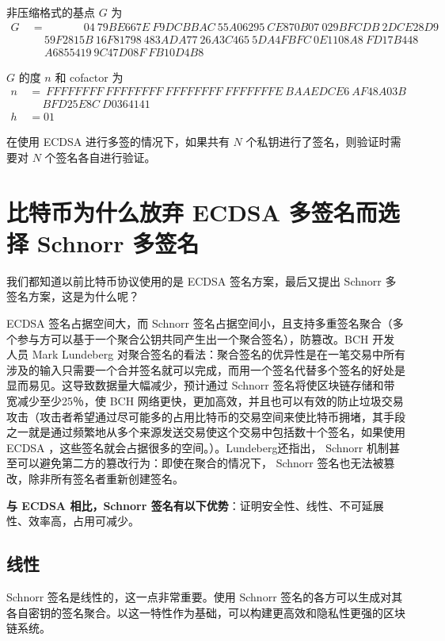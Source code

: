\documentclass[a4paper,10pt]{article}
\begin{document}
非压缩格式的基点 \(G\) 为
\begin{align*}
G\ &=\quad \qquad\ \ 04\ 79BE667E\ F9DCBBAC\ 55A06295\ CE870B07\ 029BFCDB\ 2DCE28D9 \\
   &\ \quad 59F2815B\ 16F81798\ 483ADA77\ 26A3C465\ 5DA4FBFC\ 0E1108A8\ FD17B448 \\
   &\ \quad A6855419\ 9C47D08F\ FB10D4B8
\end{align*}

\(G\) 的度 \(n\) 和 cofactor 为
\begin{align*}
n\ &=\ FFFFFFFF\ FFFFFFFF\ FFFFFFFF\ FFFFFFFE\ BAAEDCE6\ AF48A03B\\
   &\ \quad BFD25E8C\ D0364141 \\
h &= 01
\end{align*}

在使用 ECDSA 进行多签的情况下，如果共有 \(N\) 个私钥进行了签名，则验证时需要对 \(N\) 个签名各自进行验证。

\section{比特币为什么放弃 ECDSA 多签名而选择 Schnorr 多签名}
我们都知道以前比特币协议使用的是 ECDSA 签名方案，最后又提出 Schnorr 多签名方案，这是为什么呢？

 ECDSA 签名占据空间大，而 Schnorr 签名占据空间小，且支持多重签名聚合（多个参与方可以基于一个聚合公钥共同产生出一个聚合签名），防篡改。BCH 开发人员 Mark Lundeberg 对聚合签名的看法：聚合签名的优异性是在一笔交易中所有涉及的输入只需要一个合并签名就可以完成，而用一个签名代替多个签名的好处是显而易见。这导致数据量大幅减少，预计通过 Schnorr 签名将使区块链存储和带宽减少至少25％，使 BCH 网络更快，更加高效，并且也可以有效的防止垃圾交易攻击（攻击者希望通过尽可能多的占用比特币的交易空间来使比特币拥堵，其手段之一就是通过频繁地从多个来源发送交易使这个交易中包括数十个签名，如果使用 ECDSA ，这些签名就会占据很多的空间。）。Lundeberg还指出， Schnorr 机制甚至可以避免第二方的篡改行为：即使在聚合的情况下， Schnorr 签名也无法被篡改，除非所有签名者重新创建签名。

\textbf{与 ECDSA 相比，Schnorr 签名有以下优势}：证明安全性、线性、不可延展性、效率高，占用可减少。

\subsection{线性}

 Schnorr 签名是线性的，这一点非常重要。使用 Schnorr 签名的各方可以生成对其各自密钥的签名聚合。以这一特性作为基础，可以构建更高效和隐私性更强的区块链系统。
\end{document}
